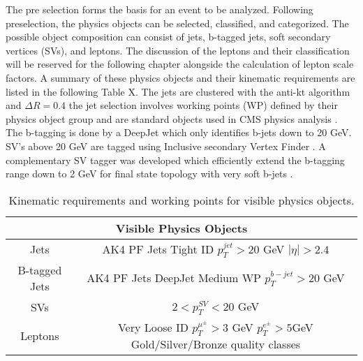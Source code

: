 
The pre selection forms the basis for an event to be analyzed. Following preselection, the physics objects can be selected, classified, and categorized. The possible object composition can consist of jets, b-tagged jets, soft secondary vertices (SVs), and leptons. The discussion of the leptons and their classification will be reserved for the following chapter alongside the calculation of lepton scale factors. A summary of these physics objects and their kinematic requirements are listed in the following Table X. The jets are clustered with the anti-kt algorithm and $\Delta R = 0.4$ \cite{Cacciari:2008gp} the jet selection involves working points (WP) defined by their physics object group and are standard objects used in CMS physics analysis \cite{CMS:2010xta}. The b-tagging is done by a DeepJet \cite{Stoye:2018qgr} which only identifies b-jets down to 20 GeV. SV's above 20 GeV are tagged using Inclusive secondary Vertex Finder \cite{CMS:2011yuk}. A complementary SV tagger was developed which efficiently extend the b-tagging range down to 2 GeV for final state topology with very soft b-jets \cite{erich}.


\begin{table}
\centering
\label{tab:physicsobjects}
\caption{Kinematic requirements and working points for visible physics objects.}
\begin{tabular}{c|c}
\hline 
\multicolumn{2}{c}{Visible Physics Objects} \\ 
\hline 
\hline
Jets & \makecell{AK4 PF Jets \\ Tight ID \\ $p_T^{jet} > 20$ GeV \\ $|\eta|>2.4$} \\ 
\hline
B-tagged Jets & \makecell{AK4 PF Jets \\ DeepJet Medium WP \\ $p_T^{b-jet} > 20 $ GeV}  \\ 
\hline
SVs & $2<p_T^{SV}<20$ GeV \\ 
\hline
Leptons & \makecell{Very Loose ID \\ $p_T^{\mu^\pm} > 3$ GeV \\ $p_T^{e^\pm} > 5 $GeV \\ Gold/Silver/Bronze quality classes} \\ 
\hline 
\end{tabular} 
\end{table}

